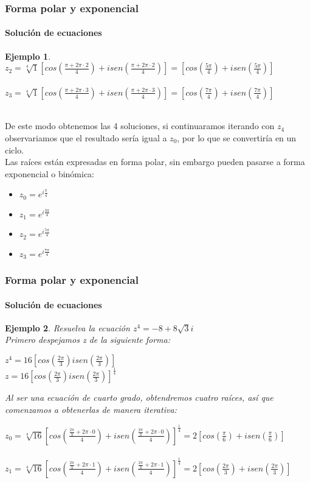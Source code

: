 \documentclass[11pt]{beamer}
\newtheorem{ejem}{Ejemplo}
\begin{document}
\begin{frame}
\frametitle{Forma polar y exponencial}
\framesubtitle{Solución de ecuaciones}
\begin{ejem}
$z_2 = \sqrt[4]{1}[cos(\frac{\pi + 2\pi \cdot 2}{4})+isen(\frac{\pi + 2\pi \cdot 2}{4})] = 
[cos(\frac{5\pi}{4})+isen(\frac{5\pi}{4})]$\\ \hspace{0cm} \\
$z_3 = \sqrt[4]{1}[cos(\frac{\pi + 2\pi \cdot 3}{4})+isen(\frac{\pi + 2\pi \cdot 3}{4})] = 
[cos(\frac{7\pi}{4})+isen(\frac{7\pi}{4})]$\\ \hspace{0cm} \\
\end{ejem}
De este modo obtenemos las 4 soluciones, si continuaramos iterando con $z_4$ observariamos que el resultado sería igual a $z_0$, por lo que se convertiría en un ciclo.\\
Las raíces están expresadas en forma polar, sin embargo pueden pasarse a forma exponencial o binómica:\\
\begin{itemize}
\item $z_0 = e^{i\frac{\pi}{4}}$
\item $z_1 = e^{i\frac{3\pi}{4}}$
\item $z_2 = e^{i\frac{5\pi}{4}}$
\item $z_3 = e^{i\frac{7\pi}{4}}$
\end{itemize}
\end{frame}

\begin{frame}
\frametitle{Forma polar y exponencial}
\framesubtitle{Solución de ecuaciones}
\begin{ejem}
Resuelva la ecuación $z^4=-8+8\sqrt{3}i$\\
Primero despejamos z de la siguiente forma:\\
\begin{center}
$z^4=16[cos(\frac{2\pi}{3})isen(\frac{2\pi}{3})]$\\
$z = 16[cos(\frac{2\pi}{3})isen(\frac{2\pi}{3})]^\frac{1}{4}$\\
\end{center}
Al ser una ecuación de cuarto grado, obtendremos cuatro raíces, así que comenzamos a obtenerlas de manera iterativa:\\
\begin{center}
$z_0 = \sqrt[4]{16}[cos(\frac{\frac{2\pi}{3}+2\pi \cdot 0}{4})+isen(\frac{\frac{2\pi}{3}+2\pi \cdot 0}{4})]^\frac{1}{4} = 
2[cos(\frac{\pi}{6})+isen(\frac{\pi}{6})]$\\ \hspace{0cm} \\
$z_1 = \sqrt[4]{16}[cos(\frac{\frac{2\pi}{3}+2\pi \cdot 1}{4})+isen(\frac{\frac{2\pi}{3}+2\pi \cdot 1}{4})]^\frac{1}{4} = 
2[cos(\frac{2\pi}{3})+isen(\frac{2\pi}{3})]$\\ \hspace{0cm} \\
\end{center}
\end{ejem}
\end{frame}
\end{document}
